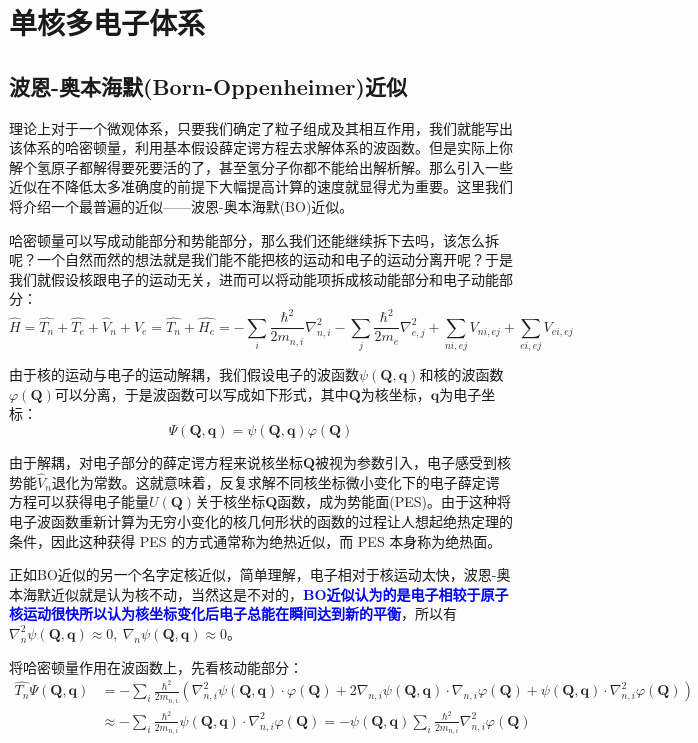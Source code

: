 \section{单核多电子体系}
\subsection{波恩-奥本海默(Born-Oppenheimer)近似}
理论上对于一个微观体系，只要我们确定了粒子组成及其相互作用，我们就能写出该体系的哈密顿量，利用基本假设薛定谔方程去求解体系的波函数。但是实际上你解个氢原子都解得要死要活的了，甚至氢分子你都不能给出解析解。那么引入一些近似在不降低太多准确度的前提下大幅提高计算的速度就显得尤为重要。这里我们将介绍一个最普遍的近似——波恩-奥本海默(BO)近似。

哈密顿量可以写成动能部分和势能部分，那么我们还能继续拆下去吗，该怎么拆呢？一个自然而然的想法就是我们能不能把核的运动和电子的运动分离开呢？于是我们就假设核跟电子的运动无关，进而可以将动能项拆成核动能部分和电子动能部分：
\[\hat{H}=\hat{T_n}+\hat{T_e}+\hat{V}_n+\hat{V}_e=\hat{T_n}+\hat{H_e}=-\sum_i\frac{\hbar^2}{2m_{n,i}}\nabla^2_{n,i}-\sum_j\frac{\hbar^2}{2m_e}\nabla^2_{e,j}+\sum_{ni,ej}V_{ni,ej}+\sum_{ei,ej}V_{ei,ej}\]

由于核的运动与电子的运动解耦，我们假设电子的波函数$\psi(\bm{Q},\bm{q})$和核的波函数$\varphi(\bm{Q})$可以分离，于是波函数可以写成如下形式，其中$\bm{Q}$为核坐标，$\bm{q}$为电子坐标：
\[\varPsi(\bm{Q},\bm{q})=\psi(\bm{Q},\bm{q})\varphi(\bm{Q})\]

由于解耦，对电子部分的薛定谔方程来说核坐标$\bm{Q}$被视为参数引入，电子感受到核势能$\hat{V}_n$退化为常数。这就意味着，反复求解不同核坐标微小变化下的电子薛定谔方程可以获得电子能量$U(\bm{Q})$关于核坐标$\bm{Q}$函数，成为势能面(PES)。由于这种将电子波函数重新计算为无穷小变化的核几何形状的函数的过程让人想起绝热定理的条件，因此这种获得 PES 的方式通常称为绝热近似，而 PES 本身称为绝热面。

正如BO近似的另一个名字定核近似，简单理解，电子相对于核运动太快，波恩-奥本海默近似就是认为核不动，当然这是不对的，\textcolor{blue}{\textbf{BO近似认为的是电子相较于原子核运动很快所以认为核坐标变化后电子总能在瞬间达到新的平衡}}，所以有$\nabla^2_n\psi(\bm{Q},\bm{q}) \approx 0, \ \nabla_n\psi(\bm{Q},\bm{q}) \approx 0$。

将哈密顿量作用在波函数上，先看核动能部分：
\[\begin{aligned}
\hat{T_n}\varPsi(\bm{Q},\bm{q})&=-\sum_i\frac{\hbar^2}{2m_{n,i}}\left (\nabla^2_{n,i}\psi(\bm{Q},\bm{q}) \cdot \varphi(\bm{Q})+2\nabla_{n,i}\psi(\bm{Q},\bm{q}) \cdot \nabla_{n,i}\varphi(\bm{Q})+ \psi(\bm{Q},\bm{q}) \cdot \nabla^2_{n,i}\varphi(\bm{Q})  \right )\\ 
&\approx -\sum_i\frac{\hbar^2}{2m_{n,i}}\psi(\bm{Q},\bm{q}) \cdot \nabla^2_{n,i}\varphi(\bm{Q})=-\psi(\bm{Q},\bm{q})\sum_i\frac{\hbar^2}{2m_{n,i}}\nabla^2_{n,i}\varphi(\bm{Q})
\end{aligned}\]

